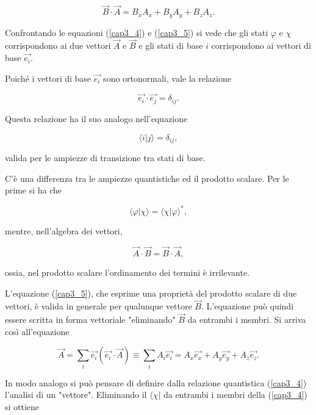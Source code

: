 \documentclass[a4paper,12pt,oneside]{book}
\begin{document}
\begin{equation}
\vec{B} \cdot \vec{A} = B_xA_x+B_yA_y+B_zA_z .
\end{equation}

Confrontando le equazioni (\ref{cap3_4}) e (\ref{cap3_5}) si vede che gli stati $\varphi$ e $\chi$ corrispondono ai due vettori $\vec{A}$ e $\vec{B}$ e gli stati di base $i$ corrispondono ai vettori di base $\vec{e_i}$.

Poiché i vettori di base $\vec{e_i}$ sono ortonormali, vale la relazione

\begin{equation}
\vec{e_i} \cdot \vec{e_j}= \delta_{ij} .
\end{equation}

Questa relazione ha il suo analogo nell'equazione

\begin{equation}
\langle i | j \rangle = \delta_{ij} ,
\end{equation}

valida per le ampiezze di transizione tra stati di base.

C'è una differenza tra le ampiezze quantistiche ed il prodotto scalare. Per le prime si ha che

\begin{equation}
\langle \varphi | \chi \rangle = \langle \chi | \varphi\rangle ^* ,
\label{cap3_6}
\end{equation} 

mentre, nell'algebra dei vettori, 

\begin{equation}
\vec{A} \cdot \vec{B}= \vec{B} \cdot \vec{A} ,
\label{cap3_7}
\end{equation}

ossia, nel prodotto scalare l'ordinamento dei termini è irrilevante.

L'equazione (\ref{cap3_5}), che esprime una proprietà del prodotto scalare di due vettori, è valida in generale per qualunque vettore $\vec{B}$. L'equazione può quindi essere scritta in forma vettoriale "eliminando" $\vec{B}$ da entrambi i membri. Si arriva così all'equazione 

\begin{equation}
\vec{A} = \sum \limits_{i} \vec{e_i} (\vec{e_i}\cdot\vec{A}) \equiv \sum \limits_{i} A_i\vec{e_i}= A_x\vec{e_x}+A_y\vec{e_y}+A_z\vec{e_z} .
\end{equation}

In modo analogo si può pensare di definire dalla relazione quantistica (\ref{cap3_4}) l'analisi di un "vettore". Eliminando il $\langle \chi |$ da entrambi i membri della (\ref{cap3_4}) si ottiene
\end{document}
